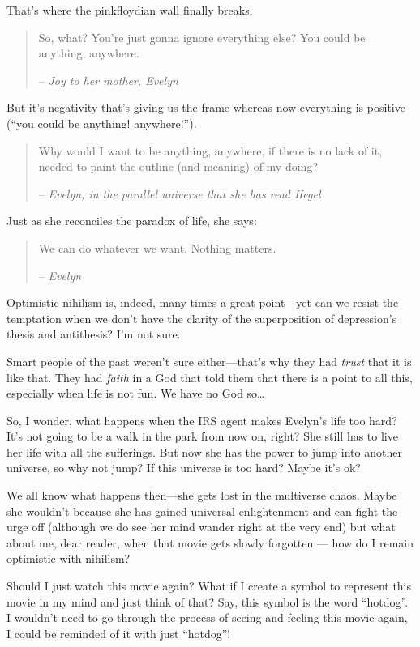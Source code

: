 That’s where the pinkfloydian wall finally breaks.

\begin{quote}
    So, what? You’re just gonna ignore everything else? You could be anything, anywhere.

    – \emph{Joy to her mother, Evelyn}
\end{quote}

But it’s negativity that’s giving us the frame whereas now everything is positive (“you could be anything! anywhere!”).

\begin{quote}
    Why would I want to be anything, anywhere, if there is no lack of it, needed to paint the outline (and meaning) of my doing?

    – \emph{Evelyn, in the parallel universe that she has read Hegel}
\end{quote}

Just as she reconciles the paradox of life, she says:

\begin{quote}
    We can do whatever we want. Nothing matters.

    – \emph{Evelyn}
\end{quote}

Optimistic nihilism is, indeed, many times a great point—yet can we resist the temptation when we don’t have the clarity of the superposition of depression’s thesis and antithesis? I’m not sure.

Smart people of the past weren’t sure either—that’s why they had \emph{trust} that it is like that. They had \emph{faith} in a God that told them that there is a point to all this, especially when life is not fun. We have no God so…

So, I wonder, what happens when the IRS agent makes Evelyn’s life too hard? It’s not going to be a walk in the park from now on, right? She still has to live her life with all the sufferings. But now she has the power to jump into another universe, so why not jump? If this universe is too hard? Maybe it’s ok?

We all know what happens then—she gets lost in the multiverse chaos. Maybe she wouldn’t because she has gained universal enlightenment and can fight the urge off (although we do see her mind wander right at the very end) but what about me, dear reader, when that movie gets slowly forgotten — how do I remain optimistic with nihilism?

Should I just watch this movie again? What if I create a symbol to represent this movie in my mind and just think of that? Say, this symbol is the word “hotdog”. I wouldn’t need to go through the process of seeing and feeling this movie again, I could be reminded of it with just “hotdog”!

